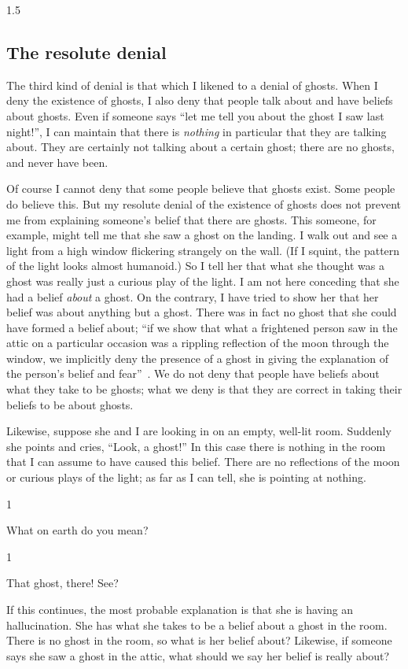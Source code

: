 \documentclass[11pt]{article}
\newcommand{\stage}[3]%
{%
	\begin{spacing}{1}%
	\vspace{0pt}
		\begin{description}[style=nextline, parsep=0pt, leftmargin=15mm, itemindent=-10mm, font=\mdseries]
			\item[\textsc{#1} \emph{#2}] #3
		\end{description}%
	\end{spacing}%
}
\begin{document}
\begin{spacing}{1.5}
\subsection{The resolute denial}
\label{resolute}
The third kind of denial is that which I likened to a denial of ghosts. When I deny the existence of ghosts, I also deny that people talk about and have beliefs about ghosts. Even if someone says ``let me tell you about the ghost I saw last night!'', I can maintain that there is {\em nothing} in particular that they are talking about. They are certainly not talking about a certain ghost; there are no ghosts, and never have been.

Of course I cannot deny that some people believe that ghosts exist. Some people do believe this. But my resolute denial of the existence of ghosts does not prevent me from explaining someone's belief that there are ghosts. This someone, for example, might tell me that she saw a ghost on the landing. I walk out and see a light from a high window flickering strangely on the wall. (If I squint, the pattern of the light looks almost humanoid.) So I tell her that what she thought was a ghost was really just a curious play of the light. I am not here conceding that she had a belief {\em about} a ghost. On the contrary, I have tried to show her that her belief was about anything but a ghost. There was in fact no ghost that she could have formed a belief about; ``if we show that what a frightened person saw in the attic on a particular occasion was a rippling reflection of the moon through the window, we implicitly deny the presence of a ghost in giving the explanation of the person's belief and fear''~\citep[76]{stroud2000a}. We do not deny that people have beliefs about what they take to be ghosts; what we deny is that they are correct in taking their beliefs to be about ghosts.

Likewise, suppose she and I are looking in on an empty, well-lit room. Suddenly she points and cries, ``Look, a ghost!'' In this case there is nothing in the room that I can assume to have caused this belief. There are no reflections of the moon or curious plays of the light; as far as I can tell, she is pointing at nothing.

\stage{Me}{}{What on earth do you mean?}

\stage{Her}{(pointing)}{That ghost, there! See?}

If this continues, the most probable explanation is that she is having an hallucination. She has what she takes to be a belief about a ghost in the room. There is no ghost in the room, so what is her belief about? Likewise, if someone says she saw a ghost in the attic, what should we say her belief is really about?


\end{spacing}
\end{document}
